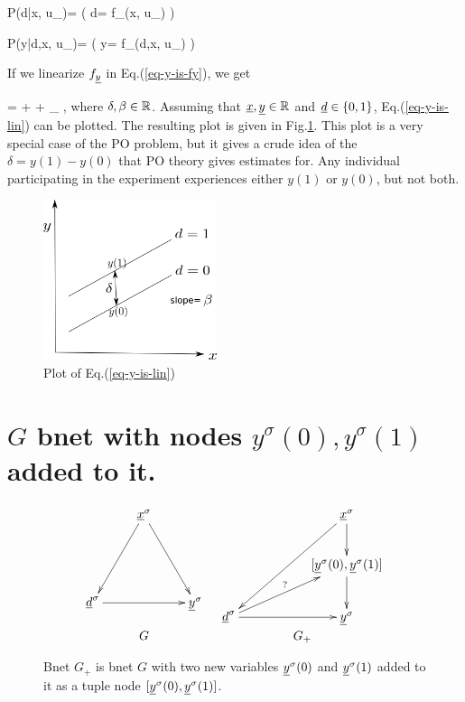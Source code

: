 \beq\color{blue}
P(d|x, u_\rvd)=
\indi( \;\; d= f_\rvd(x, u_\rvd)
\;\;)
\eeq

\beq\color{blue}
P(y|d,x, u_\rvy)=
\indi( \;\; y= f_\rvy(d,x, u_\rvy)
\;\;)
\label{eq-y-is-fy}
\eeq

If we linearize
 $f_\rvy$ in Eq.(\ref{eq-y-is-fy}),
we get

\beqa
\rvy =
\delta \rvd + \beta \rvx + \rvu_\rvy
\;,
\label{eq-y-is-lin}
\eeqa
where $\delta, \beta\in { \mathbb{R}}$.
Assuming
that $\rvx, \rvy\in \RR$
and $\rvd\in \bool$,
Eq.(\ref{eq-y-is-lin}) can be plotted.
The resulting plot
is given in Fig.\ref{fig-po-two-parallel-lines}.
This plot
is a very special
case of the PO problem,
but it gives a crude idea
of the  $\delta
= y(1)-y(0)$ that PO theory
gives estimates for.
Any
individual participating in the experiment
experiences either $y(1)$
or $y(0)$,
but not both.



\begin{figure}[h!]
\centering
\includegraphics[width=2in]
{pot-out/two-parallel-lines.png}
\caption{Plot  of
Eq.(\ref{eq-y-is-lin})}
\label{fig-po-two-parallel-lines}
\end{figure}






\section{$G$ bnet
with nodes $y^\sigma(0),
y^\sigma(1)$ added to it.}


\begin{figure}[h!]
$$
\begin{array}{ccc}
\xymatrix{
&\rvx^\s\ar[ddl]\ar[ddr]
\\
\\
\rvd^\s\ar[rr]&&\rvy^\s
}
&
\xymatrix{
&&\rvx^\s\ar[ddll]\ar[d]
\\
&&[\rvy^\s(0),\rvy^\s(1)]\ar[d]
\\
\rvd^\s\ar[urr]^?\ar[rr]
&
&\rvy^\s
}
\\
G&G_{+}
\end{array}
$$
\caption{
Bnet $G_+$ is bnet $G$
with two new variables $\rvy^\s(0)$
and $\rvy^\s(1)$
added to it as a tuple node $[\rvy^\s(0), \rvy^\s(1)]$.
}
\label{fig-po-G-im-y0-y1}
\end{figure}

